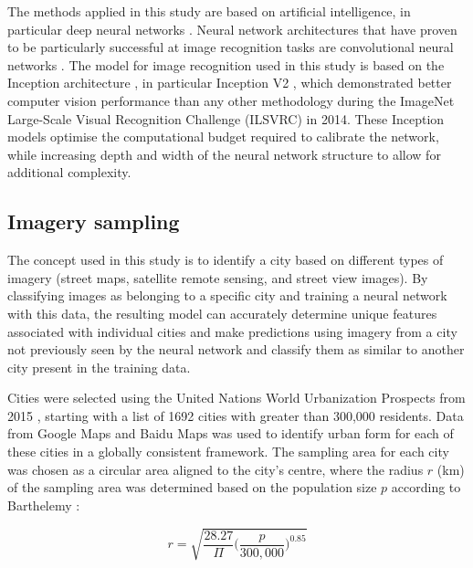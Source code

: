 \documentclass[10pt,letterpaper,hidelinks]{article}
\begin{document}
The methods applied in this study are based on artificial intelligence, in particular deep neural networks \cite{Bishop1995,Samarasinghe2016,Graupe2013}. Neural network architectures that have proven to be particularly successful at image recognition tasks are convolutional neural networks \cite{Schmidhuber2015}. The model for image recognition used in this study is based on the Inception architecture \cite{Szegedy2015}, in particular Inception V2 \cite{Ioffe2015}, which demonstrated better computer vision performance than any other methodology during the ImageNet Large-Scale Visual Recognition Challenge (ILSVRC) \cite{Russakovsky2015} in 2014. These Inception models optimise the computational budget required to calibrate the network, while increasing depth and width of the neural network structure to allow for additional complexity.



\subsection*{Imagery sampling}\label{sec:methods2}

The concept used in this study is to identify a city based on different types of imagery (street maps, satellite remote sensing, and street view images). By classifying images as belonging to a specific city and training a neural network with this data, the resulting model can accurately determine unique features associated with individual cities and make predictions using imagery from a city not previously seen by the neural network and classify them as similar to another city present in the training data.

Cities were selected using the United Nations World Urbanization Prospects from 2015 \cite{UN2014}, starting with a list of 1692 cities with greater than 300,000 residents. Data from Google Maps and Baidu Maps was used to identify urban form for each of these cities in a globally consistent framework. The sampling area for each city was chosen as a circular area aligned to the city's centre, where the radius $r$ (km) of the sampling area was determined based on the population size $p$ according to Barthelemy \cite{Barthelemy2016}: 

\begin{equation}
r = \sqrt{ \frac{28.27}{\Pi} \bigg( \frac{p}{300,000}  \bigg)^{0.85} }
\end{equation}
\end{document}
